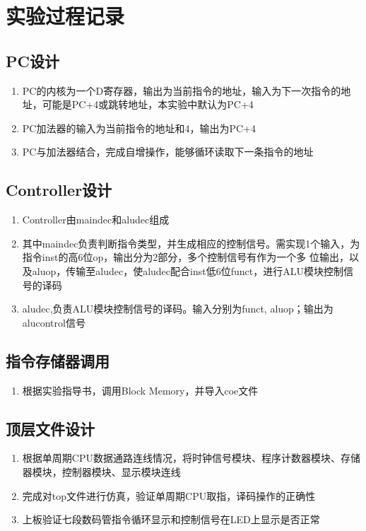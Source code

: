 \section{实验过程记录}

\subsection{PC设计}
\begin{enumerate}
    \item PC的内核为一个D寄存器，输出为当前指令的地址，输入为下一次指令的地址，可能是PC+4或跳转地址，本实验中默认为PC+4
    \item PC加法器的输入为当前指令的地址和4，输出为PC+4
    \item PC与加法器结合，完成自增操作，能够循环读取下一条指令的地址
\end{enumerate}

\subsection{Controller设计}
\begin{enumerate}
    \item Controller由maindec和aludec组成
    \item 其中maindec负责判断指令类型，并生成相应的控制信号。需实现1个输入，为指令inst的高6位op，输出分为2部分，多个控制信号有作为一个多
    位输出，以及aluop，传输至aludec，使aludec配合inst低6位funct，进行ALU模块控制信号的译码
    \item aludec,负责ALU模块控制信号的译码。输入分别为funct, aluop；输出为alucontrol信号
\end{enumerate}

\subsection{指令存储器调用}
\begin{enumerate}
    \item 根据实验指导书，调用Block Memory，并导入coe文件
\end{enumerate}

\subsection{顶层文件设计}
\begin{enumerate}
    \item 根据单周期CPU数据通路连线情况，将时钟信号模块、程序计数器模块、存储器模块，控制器模块、显示模块连线
    \item 完成对top文件进行仿真，验证单周期CPU取指，译码操作的正确性
    \item 上板验证七段数码管指令循环显示和控制信号在LED上显示是否正常
\end{enumerate}

